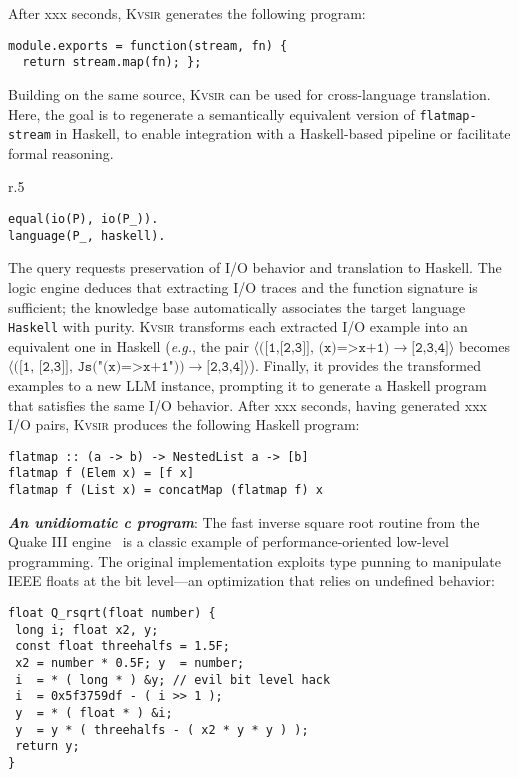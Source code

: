 \documentclass[sigplan]{acmart}
\def\eg{{\em e.g.}, }
\newcommand{\sys}{{\scshape Kv{\textalpha}sir}\xspace}
\newcommand{\heading}[1]{\vspace{2pt}\noindent\textbf{\emph{#1}}:\enspace}
\newcommand{\xxx}{\colorbox{red!30}{xxx}\xspace}
\begin{document}
After \xxx seconds, \sys generates the following program:
\begin{verbatim}
module.exports = function(stream, fn) {
  return stream.map(fn); };
\end{verbatim}


Building on the same source, \sys can be used for cross-language
translation. 
Here, the goal is to regenerate a semantically equivalent version
of \texttt{flatmap-stream} in Haskell, to enable integration with a
Haskell-based pipeline or facilitate formal reasoning.

\begin{wrapfigure}[3]{r}{.5\columnwidth}
\vspace{-10pt}
\begin{verbatim}
equal(io(P), io(P_)).
language(P_, haskell).
\end{verbatim}
\end{wrapfigure}
The query requests preservation of I/O behavior and translation to Haskell. The
logic engine deduces that extracting I/O traces and the function signature is
sufficient; the knowledge base automatically associates the target language
\texttt{Haskell} with purity.
\sys transforms each extracted I/O example into an equivalent one in Haskell (\eg 
the pair $\langle\texttt{([1,[2,3]], (x)=>x+1)}\to\texttt{[2,3,4]}\rangle$ 
becomes $\langle(\texttt{[1, [2,3]], Js("(x)=>x+1"))}\to\texttt{[2,3,4]}\rangle$).
Finally, it provides the transformed examples to a new LLM instance, prompting it
to generate a Haskell program that satisfies the same I/O behavior.
After \xxx seconds, having generated \xxx I/O pairs, \sys produces the following
Haskell program:
\begin{verbatim}
flatmap :: (a -> b) -> NestedList a -> [b]
flatmap f (Elem x) = [f x]
flatmap f (List x) = concatMap (flatmap f) x
\end{verbatim}

\heading{An unidiomatic c program}
The fast inverse square root routine from the Quake III
engine~\cite{fast_inv_sqrt}
is a classic example of performance-oriented low-level programming.
The original implementation exploits type punning to manipulate IEEE
floats at the bit level---an optimization that relies on undefined behavior:

\begin{verbatim}
float Q_rsqrt(float number) {
 long i; float x2, y;
 const float threehalfs = 1.5F;
 x2 = number * 0.5F; y  = number;
 i  = * ( long * ) &y; // evil bit level hack
 i  = 0x5f3759df - ( i >> 1 );
 y  = * ( float * ) &i;
 y  = y * ( threehalfs - ( x2 * y * y ) );
 return y;
}
\end{verbatim}
\end{document}

